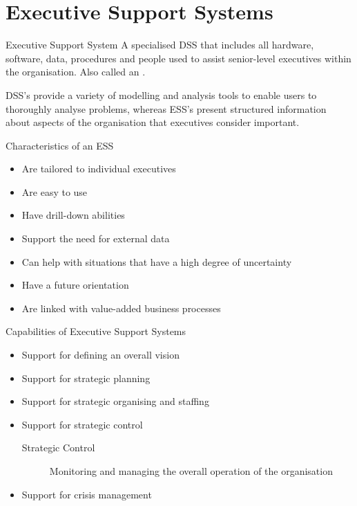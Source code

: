 \documentclass[\main/notes.tex]{subfiles}
\begin{document}
		\section{Executive Support Systems}
			\begin{definition}{Executive Support System}
				A specialised DSS that includes all hardware, software, data, procedures and people used to assist senior-level executives within the organisation. Also called an .

				DSS's provide a variety of modelling and analysis tools to enable users to thoroughly analyse problems, whereas ESS's present structured information about aspects of the organisation that executives consider important.
			\end{definition}
			\begin{sidenote}{Characteristics of an ESS}
				\begin{itemize}[nosep]
					\item Are tailored to individual executives
					\item Are easy to use
					\item Have drill-down abilities
					\item Support the need for external data
					\item Can help with situations that have a high degree of uncertainty
					\item Have a future orientation
					\item Are linked with value-added business processes
				\end{itemize}
			\end{sidenote}
			\begin{sidenote}{Capabilities of Executive Support Systems}
				\begin{itemize}[nosep]
					\item Support for defining an overall vision
					\item Support for strategic planning
					\item Support for strategic organising and staffing
					\item Support for strategic control
						\begin{description}
							\item[Strategic Control] Monitoring and managing the overall operation of the organisation
						\end{description}
					\item Support for crisis management
				\end{itemize}
			\end{sidenote}
\end{document}
